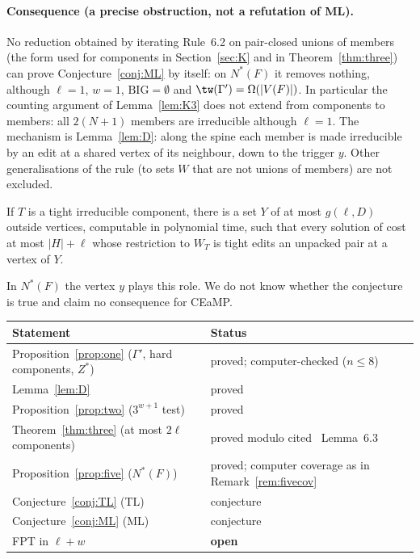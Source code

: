 \paragraph{Consequence (a precise obstruction, not a refutation of ML).}
No reduction obtained by iterating Rule~6.2 on pair-closed unions of members (the form used for components in Section~\ref{sec:K} and in Theorem~\ref{thm:three}) can prove Conjecture~\ref{conj:ML} by itself: on $N^*(F)$ it removes nothing, although $\ell=1$, $w=1$, $\mathrm{BIG}=\emptyset$ and $\tw(\Gamma')=\Omega(|V(F)|)$. In particular the counting argument of Lemma~\ref{lem:K3} does not extend from components to members: all $2(N+1)$ members are irreducible although $\ell=1$. The mechanism is Lemma~\ref{lem:D}: along the spine each member is made irreducible by an edit at a shared vertex of its neighbour, down to the trigger $y$. Other generalisations of the rule (to sets $W$ that are not unions of members) are not excluded.

\begin{conjecture}\label{conj:TL}
If $T$ is a tight irreducible component, there is a set $Y$ of at most $g(\ell,D)$ outside vertices, computable in polynomial time, such that every solution of cost at most $|H|+\ell$ whose restriction to $W_T$ is tight edits an unpacked pair at a vertex of $Y$.
\end{conjecture}
In $N^*(F)$ the vertex $y$ plays this role. We do not know whether the conjecture is true and claim no consequence for CEaMP.

\begin{center}
\begin{tabular}{@{}ll@{}}
\hline
Statement & Status\\
\hline
Proposition~\ref{prop:one} ($\Gamma'$, hard components, $Z^*$) & proved; computer-checked ($n\le8$)\\
Lemma~\ref{lem:D} & proved\\
Proposition~\ref{prop:two} ($3^{w+1}$ test) & proved\\
Theorem~\ref{thm:three} (at most $2\ell$ components) & proved modulo cited~\cite{BFK18} Lemma~6.3\\
Proposition~\ref{prop:five} ($N^*(F)$) & proved; computer coverage as in Remark~\ref{rem:fivecov}\\
Conjecture~\ref{conj:TL} (TL) & conjecture\\
Conjecture~\ref{conj:ML} (ML) & conjecture\\
FPT in $\ell+w$ & \textbf{open}\\
\hline
\end{tabular}
\end{center}
